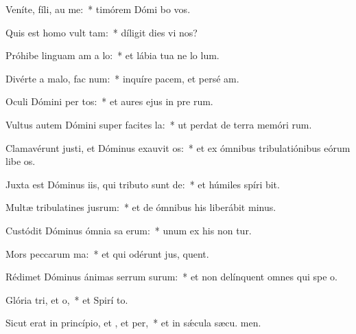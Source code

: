 \item Veníte, fíli, au me:~* timórem Dómi bo vos.
\item Quis est homo  vult tam:~* díligit dies vi nos?
\item Próhibe linguam am a lo:~* et lábia tua ne lo lum.
\item Divérte a malo,  fac num:~* inquíre pacem, et persé am.
\item Oculi Dómini per tos:~* et aures ejus in pre rum.
\item Vultus autem Dómini super facites la:~* ut perdat de terra memóri rum.
\item Clamavérunt justi, et Dóminus exauvit os:~* et ex ómnibus tribulatiónibus eórum libe os.
\item Juxta est Dóminus iis, qui tributo sunt de:~* et húmiles spíri bit.
\item Multæ tribulatines jusrum:~* et de ómnibus his liberábit  minus.
\item Custódit Dóminus ómnia sa erum:~* unum ex his non tur.
\item Mors peccarum ma:~* et qui odérunt jus, quent.
\item Rédimet Dóminus ánimas serrum surum:~* et non delínquent omnes qui spe  o.
\item Glória tri, et o,~* et Spirí to.
\item Sicut erat in princípio, et , et per,~* et in sǽcula sæcu. men.
